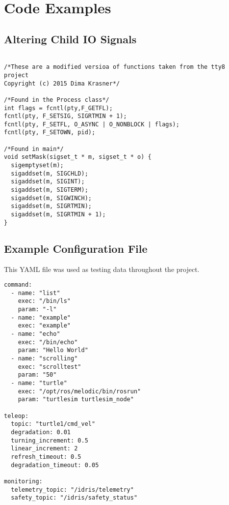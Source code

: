 \chapter{Code Examples}
\label{appendix:c}




\section{Altering Child IO Signals}

\begin{verbatim}

/*These are a modified versioa of functions taken from the tty8 project
Copyright (c) 2015 Dima Krasner*/

/*Found in the Process class*/
int flags = fcntl(pty,F_GETFL);
fcntl(pty, F_SETSIG, SIGRTMIN + 1);
fcntl(pty, F_SETFL, O_ASYNC | O_NONBLOCK | flags);     
fcntl(pty, F_SETOWN, pid);

/*Found in main*/
void setMask(sigset_t * m, sigset_t * o) {
  sigemptyset(m);
  sigaddset(m, SIGCHLD);
  sigaddset(m, SIGINT);
  sigaddset(m, SIGTERM);
  sigaddset(m, SIGWINCH);
  sigaddset(m, SIGRTMIN);
  sigaddset(m, SIGRTMIN + 1);
}
\end{verbatim}

\section{Example Configuration File}

This YAML file was used as testing data throughout the project.

\begin{verbatim}
command:
  - name: "list"
    exec: "/bin/ls"
    param: "-l"
  - name: "example"
    exec: "example"
  - name: "echo"
    exec: "/bin/echo"
    param: "Hello World"
  - name: "scrolling"
    exec: "scrolltest"
    param: "50"
  - name: "turtle"
    exec: "/opt/ros/melodic/bin/rosrun"
    param: "turtlesim turtlesim_node"

teleop:
  topic: "turtle1/cmd_vel"
  degradation: 0.01
  turning_increment: 0.5
  linear_increment: 2
  refresh_timeout: 0.5
  degradation_timeout: 0.05

monitoring:
  telemetry_topic: "/idris/telemetry"
  safety_topic: "/idris/safety_status"
\end{verbatim}

